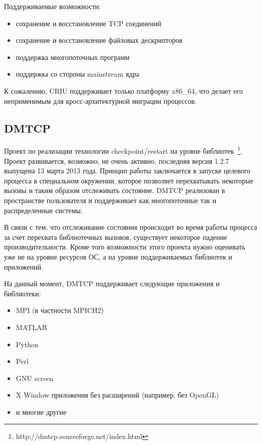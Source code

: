 Поддерживаемые возможности:

\begin{itemize}

    \item сохранение и восстановление TCP соединений
    \item сохранение и восстановление файловых дескрипторов
    \item поддержка многопоточных программ
    \item поддержка со стороны mainstream ядра

\end{itemize}

К сожалению, CRIU поддерживает только платформу x86\_64, что делает его неприменимым для кросс-архитектурной миграции процессов.

\subsection{DMTCP}

Проект по реализации технологии checkpoint/restart на уровне библиотек~\footnote{http://dmtcp.sourceforge.net/index.html}. Проект развивается, возможно, не очень активно, последняя версия 1.2.7 выпущена 13 марта 2013 года. Принцип работы заключается в запуске целевого процесса в специальном окружении, которое позволяет перехватывать некоторые вызовы и таким образом отслеживать состояние. DMTCP реализован в пространстве пользователя и поддерживает как многопоточные так и распределенные системы.

В связи с тем, что отслеживание состояния происходит во время работы процесса за счет перехвата библиотечных вызовов, существует некоторое падение производительности. Кроме того возможности этого проекта нужно оценивать уже не на уровне ресурсов ОС, а на уровне поддерживаемых библиотек и приложений.

На данный момент, DMTCP поддерживает следующие приложения и библиотеки:

\begin{itemize}

    \item MPI (в частности MPICH2)
    \item MATLAB
    \item Python
    \item Perl
    \item GNU screen
    \item X Window приложения без расширений (например, без OpenGL)
    \item и многие другие

\end{itemize}

